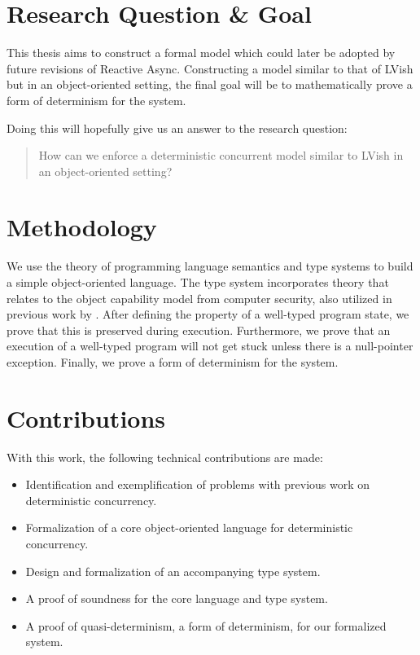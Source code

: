 
\section{Research Question \& Goal}%
\label{sec:goal}


This thesis aims to construct a formal model which could later be adopted by
future revisions of Reactive Async. Constructing a model similar to that
of LVish but in an object-oriented setting, the final goal
will be to mathematically prove a form of determinism for the system.

Doing this will hopefully give us an answer to the research question:

\begin{quotation}
  How can we enforce a deterministic concurrent model similar to LVish in an
  object-oriented setting?
\end{quotation}

\section{Methodology}%
\label{sec:methodology}

We use the theory of programming language semantics and type systems to build a
simple object-oriented language. The type system incorporates theory that
relates to the object capability model from computer security, also utilized in
previous work by \textcite{conf/oopsla/HallerL16}.  After defining the property
of a well-typed program state, we prove that this is preserved during execution.
Furthermore, we prove that an execution of a well-typed program will not get
stuck unless there is a null-pointer exception. Finally, we prove a form of
determinism for the system.

\section{Contributions}%
\label{sec:contributions}

With this work, the following technical contributions are made:
\begin{itemize}
  \item Identification and exemplification of  problems with previous work on
    deterministic concurrency.
  \item Formalization of a core object-oriented language for deterministic
    concurrency.
  \item Design and formalization of an accompanying type system.
  \item A proof of soundness for the core language and type system.
  \item A proof of quasi-determinism, a form of determinism, for our
    formalized system.
\end{itemize}

